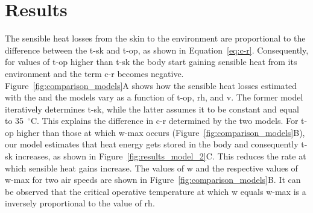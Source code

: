 

\section{Results}\label{sec:results}

The sensible heat losses from the skin to the environment are proportional to the difference between the \ac{t-sk} and \ac{t-op}, as shown in Equation~\ref{eq:c-r}.
Consequently, for values of \ac{t-op} higher than \ac{t-sk} the body start gaining sensible heat from its environment and the term \ac{c-r} becomes negative.
Figure~\ref{fig:comparison_models}A shows how the sensible heat losses estimated with the  and the  models vary as a function of \ac{t-op}, \ac{rh}, and \ac{v}.
The former model iteratively determines \ac{t-sk}, while the latter assumes it to be constant and equal to 35~$^{\circ}$C.
This explains the difference in \ac{c-r} determined by the two models.
For \ac{t-op} higher than those at which \ac{w-max} occurs (Figure~\ref{fig:comparison_models}B), our model estimates that heat energy gets stored in the body and consequently \ac{t-sk} increases, as shown in Figure~\ref{fig:results_model_2}C\@.
This reduces the rate at which sensible heat gains increase.
The values of \ac{w} and the respective values of \ac{w-max} for two air speeds are shown in Figure~\ref{fig:comparison_models}B\@.
It can be observed that the critical operative temperature at which \ac{w} equals \ac{w-max} is a inversely proportional to the value of \ac{rh}.

